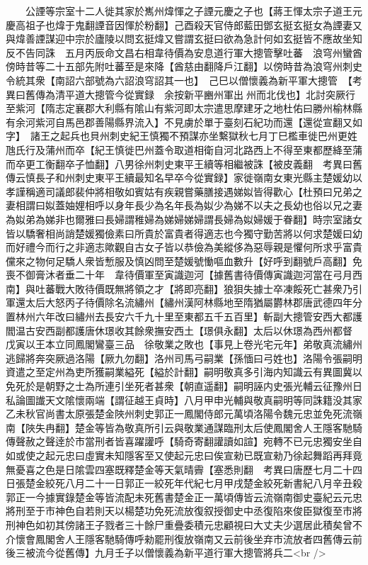 　　公諲等宗室十二人徙其家於嶲州煒惲之子諲元慶之子也【蔣王惲太宗子道王元慶高祖子也煒于鬼翻諲音因惲於粉翻】己酉殺天官侍郎藍田鄧玄挺玄挺女為諲妻又與煒善諲謀迎中宗於廬陵以問玄挺煒又嘗謂玄挺曰欲為急計何如玄挺皆不應故坐知反不告同誅　五月丙辰命文昌右相韋待價為安息道行軍大摠管擊吐蕃　浪穹州蠻酋傍時昔等二十五部先附吐蕃至是來降【酋慈由翻降戶江翻】以傍時昔為浪穹州刺史令統其衆【南詔六部號為六詔浪穹詔其一也】　己巳以僧懷義為新平軍大摠管　【考異曰舊傳為清平道大摠管今從實録　余按新平豳州軍出州而北伐也】北討突厥行至紫河【隋志定襄郡大利縣有隂山有紫河即太宗遣思摩建牙之地杜佑曰勝州榆林縣有余河紫河自馬邑郡善陽縣界流入】不見虜於單于臺刻石紀功而還【還從宣翻又如字】　諸王之起兵也貝州刺史紀王慎獨不預謀亦坐繫獄秋七月丁巳檻車徙巴州更姓虺氏行及蒲州而卒【紀王慎徙巴州蓋令取道相衛自河北路西上不得至東都歷絳至蒲而卒更工衡翻卒子恤翻】八男徐州刺史東平王續等相繼被誅【被皮義翻　考異曰舊傳云慎長子和州刺史東平王續最知名早卒今從實録】家徙嶺南女東光縣主楚媛幼以孝謹稱適司議郎裴仲將相敬如賓姑有疾親嘗藥膳接遇娣姒皆得歡心【杜預曰兄弟之妻相謂曰姒蓋妯娌相呼以身年長少為名年長為姒少為娣不以夫之長幼也俗以兄之妻為姒弟為娣非也爾雅曰長婦謂稚婦為娣婦娣婦謂長婦為姒婦媛于眷翻】時宗室諸女皆以驕奢相尚誚楚媛獨儉素曰所貴於富貴者得適志也今獨守勤苦將以何求楚媛曰幼而好禮今而行之非適志歟觀自古女子皆以恭儉為美縱侈為惡辱親是懼何所求乎富貴儻來之物何足驕人衆皆慙服及慎凶問至楚媛號慟嘔血數升【好呼到翻號戶高翻】免喪不御膏沐者垂二十年　韋待價軍至寅識迦河【據舊書待價傳寅識迦河當在弓月西南】與吐蕃戰大敗待價既無將領之才【將即亮翻】狼狽失據士卒凍餒死亡甚衆乃引軍還太后大怒丙子待價除名流繡州【繡州漢阿林縣地至隋猶屬欝林郡唐武德四年分置林州六年改曰繡州去長安六千九十里至東都五千五百里】斬副大摠管安西大都護閻温古安西副都護唐休璟收其餘衆撫安西土【璟俱永翻】太后以休璟為西州都督　戊寅以王本立同鳳閣鸞臺三品　徐敬業之敗也【事見上卷光宅元年】弟敬真流繡州逃歸將奔突厥過洛陽【厥九勿翻】洛州司馬弓嗣業【孫愐曰弓姓也】洛陽令張嗣明資遣之至定州為吏所獲嗣業縊死【縊於計翻】嗣明敬真多引海内知識云有異圖冀以免死於是朝野之士為所連引坐死者甚衆【朝直遥翻】嗣明誣内史張光輔云征豫州日私論圖䜟天文隂懷兩端【謂征越王貞時】八月甲申光輔與敬真嗣明等同誅籍没其家乙未秋官尚書太原張楚金陜州刺史郭正一鳳閣侍郎元萬頃洛陽令魏元忠並免死流嶺南【陜失冉翻】楚金等皆為敬真所引云與敬業通謀臨刑太后使鳳閣舍人王隱客馳騎傳聲赦之聲逹於市當刑者皆喜躍讙呼【騎奇寄翻讙讀如諠】宛轉不已元忠獨安坐自如或使之起元忠曰虛實未知隱客至又使起元忠曰俟宣勑已既宣勑乃徐起舞蹈再拜竟無憂喜之色是日隂雲四塞既釋楚金等天氣晴霽【塞悉則翻　考異曰唐歷七月二十四日張楚金絞死八月二十一日郭正一絞死年代紀七月甲戌楚金絞死新書紀八月辛丑殺郭正一今據實錄楚金等皆流配未死舊書楚金正一萬頃傳皆云流嶺南御史臺紀云元忠將刑至于市神色自若則天以楊楚功免死流放復叙授御史中丞復陷來俊臣獄復至市將刑神色如初其傍諸王子戮者三十餘尸重疊委積元忠顧視曰大丈夫少選居此積矣曾不介懷會鳳閣舍人王隱客馳騎傳呼勑罷刑復放嶺南又云前後坐弃市流放者四舊傳云前後三被流今從舊傳】九月壬子以僧懷義為新平道行軍大摠管將兵二<br />
